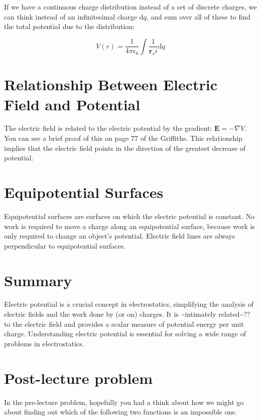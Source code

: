 \documentclass[
  letterpaper,
  DIV=11,
  numbers=noendperiod]{scrreprt}
\begin{document}
If we have a continuous charge distribution instead of a set of discrete
charges, we can think instead of an infinitesimal charge
\(\mathrm{d}q\), and sum over all of these to find the total potential
due to the distribution:

\[ V(r) = \frac{1}{4\pi \epsilon_0} \int \frac{1}{\mathrm{\mathbf{r}}_si} \mathrm{d}q \]

\section{Relationship Between Electric Field and
Potential}\label{relationship-between-electric-field-and-potential}

The electric field is related to the electric potential by the gradient:
\(\mathrm{\mathbf{E}}= -\nabla V\). You can see a brief proof of this on
page 77 of the Griffiths. This relationship implies that the electric
field points in the direction of the greatest decrease of potential.

\section{Equipotential Surfaces}\label{equipotential-surfaces}

Equipotential surfaces are surfaces on which the electric potential is
constant. No work is required to move a charge along an equipotential
surface, because work is only required to change an object's potential.
Electric field lines are always perpendicular to equipotential surfaces.

\section{Summary}\label{summary-1}

Electric potential is a crucial concept in electrostatics, simplifying
the analysis of electric fields and the work done by (or on) charges. It
is \textasciitilde intimately related\textasciitilde?? to the electric
field and provides a scalar measure of potential energy per unit charge.
Understanding electric potential is essential for solving a wide range
of problems in electrostatics.

\section{Post-lecture problem}\label{post-lecture-problem-1}

In the pre-lecture problem, hopefully you had a think about how we might
go about finding out which of the following two functions is an
impossible one.
\end{document}
